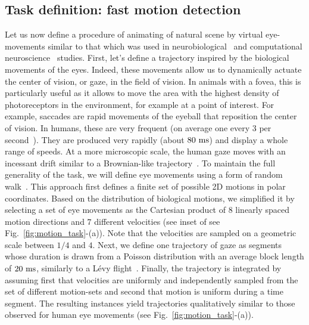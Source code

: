 \documentclass[default]{sn-jnl}%
\theoremstyle{thmstyleone}%
\theoremstyle{thmstyletwo}%
\theoremstyle{thmstylethree}%
\newcommand{\seeFig}[1]{see Fig.~\ref{fig:#1}}%
\begin{document}
\subsection{Task definition: fast motion detection}
Let us now define a procedure of animating of natural scene by virtual eye-movements  similar to that which was used in neurobiological~\citep{vinje_sparse_2000, baudot_animation_2013} and computational neuroscience~\citep{kremkow_push-pull_2016} studies. First, let's define a trajectory inspired by the biological movements of the eyes. Indeed, these movements allow us to dynamically actuate the center of vision, or gaze, in the field of vision. In animals with a fovea, this is particularly useful as it allows to move the area with the highest density of photoreceptors in the environment, for example at a point of interest. For example, saccades are rapid movements of the eyeball that reposition the center of vision. In humans, these are very frequent (on average one every 3 per second~\citep{dandekar_neural_2012}). They are produced very rapidly (about $80~\si{\milli\second}$) and display a whole range of speeds. At a more microscopic scale, the human gaze moves with an incessant drift similar to a Brownian-like trajectory~\citep{poletti_head-eye_2015}. To maintain the full generality of the task, we will define eye movements using a form of random walk~\citep{engbert_integrated_2011}. This approach first defines a finite set of possible 2D motions in polar coordinates. Based on the distribution of biological motions, we simplified it by selecting a set of eye movements as the Cartesian product of %
$8$ linearly spaced motion directions and %
$7$ different velocities (see inset of \seeFig{motion_task}-(a)). Note that the velocities are sampled on a geometric scale between $1/4$ and $4$. Next, we define one trajectory of gaze as segments whose duration is drawn from a Poisson distribution with an average block length of $20~\si{\milli\second}$, similarly to a Lévy flight~\citep[p. 289]{mandelbrot_fractal_1982}. Finally, the trajectory is integrated by assuming first that velocities are uniformly and independently sampled from the set of different motion-sets and second that motion is uniform during a time segment. The resulting instances yield trajectories qualitatively similar to those observed for human eye movements (\seeFig{motion_task}-(a)). 
\end{document}
